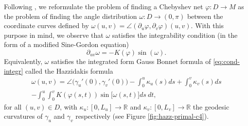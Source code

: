 \documentclass{article}
\newcommand{\DUV}{\partial_{uv}}
\newcommand{\R}{\mathbb{R}}
\newcommand{\surf}{M}
\newcommand{\ko}{\kappa}
\newcommand{\DU}{\partial_{u}}
\newcommand{\DV}{\partial_{v}}
\theoremstyle{remark}
\theoremstyle{prpart}
\begin{document}
Following \cite{Ghys09}, we reformulate the problem of finding a Chebyshev net $\varphi:D\to\surf$ as the problem of finding the angle distribution $\omega:D\to(0,\pi)$ between the coordinate curves defined by $\omega(u,v) = \angle(\DU\varphi, \DV\varphi)(u,v)$. With this purpose in mind, we observe that $\omega$ satisfies the integrability condition (in the form of a modified Sine-Gordon equation) \cite{Ghys09}
\begin{equation}  \label{eq:cond-integr}
  \DUV \omega = -K(\varphi) \sin(\omega).
\end{equation}
Equivalently, $\omega$ satisfies the integrated form Gauss Bonnet formula of \eqref{eq:cond-integr} called the Hazzidakis formula
\begin{multline}  \label{eq:hazz-form}
 \omega(u,v) = \angle\big(\gamma_u'(0),\gamma_v'(0)\big) - \int_0^u \ko_u(s)ds +
  \int_{0}^v\ko_v(s)ds\\
 - \int_0^u\int_0^vK(\varphi(s,t))\sin\big[\omega(s,t)\big]ds~dt,
\end{multline} 
for all $(u,v)\in D$, with $\ko_u:[0,L_u]\to\R$ and $\ko_v:[0,L_v]\to\R$ the geodesic curvatures of $\gamma_u$ and $\gamma_v$ respectively (see Figure \ref{fig:hazz-primal-c4}). 
\end{document}
